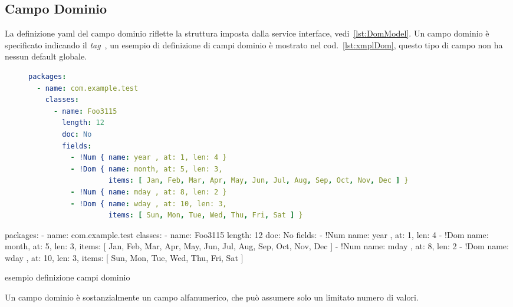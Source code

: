 \subsection{Campo Dominio} \label{sub:yaml.dom}
La definizione yaml del campo dominio riflette la struttura imposta dalla
service interface, vedi~\ref{lst:DomModel}.
Un campo dominio è specificato indicando il \textsl{tag} 
\,, 
un esempio di definizione di campi dominio è mostrato nel 
cod.~\ref{lst:xmplDom}, questo tipo di campo non ha nessun default globale.


\ifesource
\begin{figure*}[!htb]
\begin{lstlisting}[language=yaml, caption={esempio definizione campi dominio}, 
label=lst:xmplDom]
packages:
  - name: com.example.test
    classes:
      - name: Foo3115
        length: 12
        doc: No
        fields:
          - !Num { name: year , at: 1, len: 4 }
          - !Dom { name: month, at: 5, len: 3, 
                   items: [ Jan, Feb, Mar, Apr, May, Jun, Jul, Aug, Sep, Oct, Nov, Dec ] }
          - !Num { name: mday , at: 8, len: 2 }
          - !Dom { name: wday , at: 10, len: 3, 
                   items: [ Sun, Mon, Tue, Wed, Thu, Fri, Sat ] }
\end{lstlisting}
\end{figure*}
\else
\begin{elisting}[!htb]
\begin{yamlcode}
packages:
  - name: com.example.test
    classes:
      - name: Foo3115
        length: 12
        doc: No
        fields:
          - !Num { name: year , at: 1, len: 4 }
          - !Dom { name: month, at: 5, len: 3, 
                   items: [ Jan, Feb, Mar, Apr, May, Jun, Jul, Aug, Sep, Oct, Nov, Dec ] }
          - !Num { name: mday , at: 8, len: 2 }
          - !Dom { name: wday , at: 10, len: 3, 
                   items: [ Sun, Mon, Tue, Wed, Thu, Fri, Sat ] }
\end{yamlcode}
\caption{esempio definizione campi dominio}
\label{lst:xmplDom}
\end{elisting}
\fi

Un campo dominio è sostanzialmente un campo alfanumerico, che può assumere solo
un limitato numero di valori.

